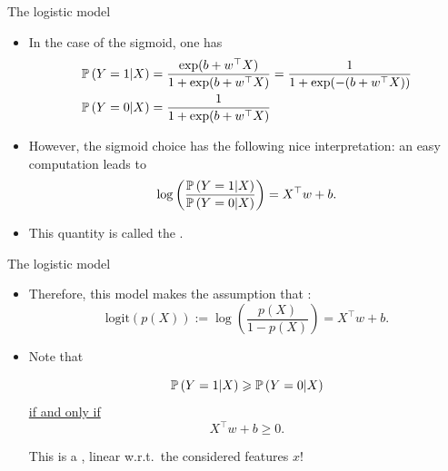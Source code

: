 \documentclass[xcolor={usenames,dvipsnames},handout]{beamer}
\begin{document}
\begin{frame}{The logistic model}

\begin{itemize}
\item In the case of the sigmoid,
one has
\begin{align*}
\P\left(  Y = 1 | X \right) &= \frac{\exp (b+ w^\top X)}{1+ \exp(b+ w^\top X)} = \frac{1}{1+\exp(-(b+ w^\top X)) } \\
\P\left(  Y = 0 | X \right) &=  \frac{1}{1+\exp(b+ w^\top X) }
\end{align*}

\item However, the sigmoid choice has the following nice interpretation: an easy computation leads to
$$
\log \left( \frac{\P\left(  Y = 1 | X \right)}{\P\left(  Y = 0| X  \right)} \right) = X^\top w +b.
$$
\item This quantity is called the .
\end{itemize}
\end{frame}

\begin{frame}{The logistic model}

\begin{itemize}
\item Therefore, this model makes the assumption that :
$$
\mathrm{logit} (p(X)) := \log\left( \frac{p(X)}{1-p(X)} \right) = X^\top w + b.
$$
\pause
\item Note that 
\begin{block}{}
$$
\P\left(  Y = 1 | X \right) \geq \P\left(  Y = 0 | X \right)
$$
\underline{if and only if}
$$
X^\top w + b \geq 0.
$$
\end{block}
\pause
This is a , linear w.r.t.\ the considered features $x$!
\end{itemize}
\end{frame}
\end{document}
